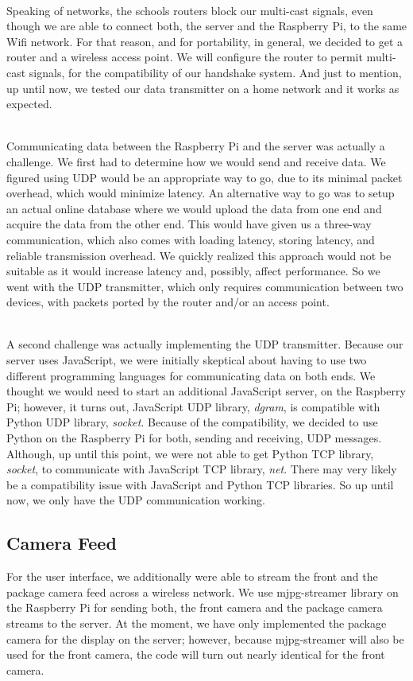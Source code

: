 \documentclass[onecolumn, oneside, letterpaper, draftclsnofoot, 10pt, compsoc]{IEEEtran}
\begin{document}
\noindent \\
Speaking of networks, the school\textquotesingle s routers block our multi-cast signals, even though we are able to connect both, the server and the Raspberry Pi, to the same Wifi network. For that reason, and for portability, in general, we decided to get a router and a wireless access point. We will configure the router to permit multi-cast signals, for the compatibility of our handshake system. And just to mention, up until now, we tested our data transmitter on a home network and it works as expected.

\noindent \\
Communicating data between the Raspberry Pi and the server was actually a challenge. We first had to determine how we would send and receive data. We figured using UDP would be an appropriate way to go, due to its minimal packet overhead, which would minimize latency. An alternative way to go was to setup an actual online database where we would upload the data from one end and acquire the data from the other end. This would have given us a three-way communication, which also comes with loading latency, storing latency, and reliable transmission overhead. We quickly realized this approach would not be suitable as it would increase latency and, possibly, affect performance. So we went with the UDP transmitter, which only requires communication between two devices, with packets ported by the router and/or an access point.

\noindent \\
A second challenge was actually implementing the UDP transmitter. Because our server uses JavaScript, we were initially skeptical about having to use two different programming languages for communicating data on both ends. We thought we would need to start an additional JavaScript server, on the Raspberry Pi; however, it turns out, JavaScript UDP library, \textit{dgram}, is compatible with Python UDP library, \textit{socket}. Because of the compatibility, we decided to use Python on the Raspberry Pi for both, sending and receiving, UDP messages. Although, up until this point, we were not able to get Python TCP library, \textit{socket}, to communicate with JavaScript TCP library, \textit{net}. There may very likely be a compatibility issue with JavaScript and Python TCP libraries. So up until now, we only have the UDP communication working.

\subsection{Camera Feed}
\noindent
For the user interface, we additionally were able to stream the front and the package camera feed across a wireless network. We use mjpg-streamer library on the Raspberry Pi for sending both, the front camera and the package camera streams to the server. At the moment, we have only implemented the package camera for the display on the server; however, because mjpg-streamer will also be used for the front camera, the code will turn out nearly identical for the front camera.
\end{document}
